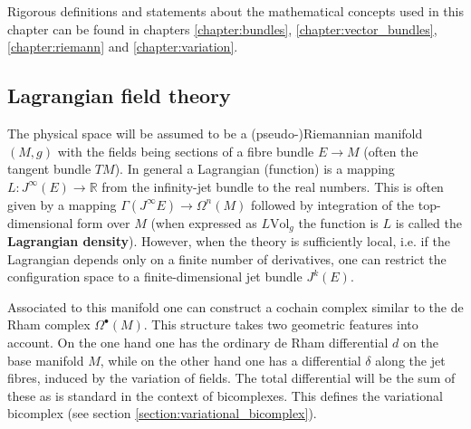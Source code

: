 \chapter{}\label{chapter:classical_fields}

    Rigorous definitions and statements about the mathematical concepts used in this chapter can be found in chapters \ref{chapter:bundles}, \ref{chapter:vector_bundles}, \ref{chapter:riemann} and \ref{chapter:variation}.

\section{Lagrangian field theory}

    The physical space will be assumed to be a (pseudo-)Riemannian manifold $(M,g)$ with the fields being sections of a fibre bundle $E\rightarrow M$ (often the tangent bundle $TM$). In general a Lagrangian (function) is a mapping $L:J^\infty(E)\rightarrow\mathbb{R}$ from the infinity-jet bundle to the real numbers. This is often given by a mapping $\Gamma(J^\infty E)\rightarrow\Omega^n(M)$ followed by integration of the top-dimensional form over $M$ (when expressed as $L\text{Vol}_g$ the function is $L$ is called the \textbf{Lagrangian density}). However, when the theory is sufficiently local, i.e. if the Lagrangian depends only on a finite number of derivatives, one can restrict the configuration space to a finite-dimensional jet bundle $J^k(E)$.

    Associated to this manifold one can construct a cochain complex similar to the de Rham complex $\Omega^\bullet(M)$. This structure takes two geometric features into account. On the one hand one has the ordinary de Rham differential $d$ on the base manifold $M$, while on the other hand one has a differential $\delta$ along the jet fibres, induced by the variation of fields. The total differential will be the sum of these as is standard in the context of bicomplexes. This defines the variational bicomplex (see section \ref{section:variational_bicomplex}).

